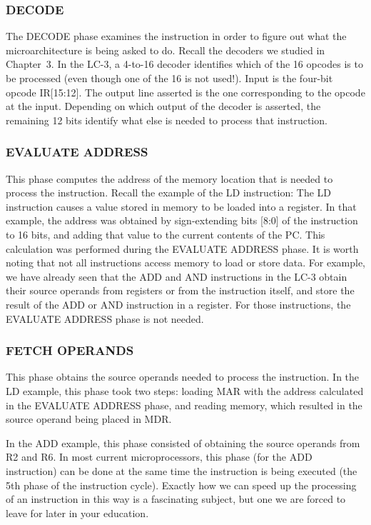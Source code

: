 \documentclass{patt}
\begin{document}
\subsubsection{DECODE}
The DECODE phase examines the instruction in order to figure out what
the microarchitecture is being asked to do.  Recall the decoders we
studied in Chapter~3.  In the LC-3, a 4-to-16 decoder identifies which
of the 16 opcodes is to be processed (even though one of the 16 is not 
used!).  Input is the four-bit opcode
IR[15:12].  The output line asserted is the one corresponding to the
opcode at the input.  Depending on which output of the decoder is
asserted, the remaining 12 bits identify what else is needed to
process that instruction.

\subsubsection{EVALUATE ADDRESS}
This phase computes the address of the memory location that is needed
to process the instruction.  Recall the example of the LD
instruction: The LD instruction causes a value stored in memory to be
loaded into a register.  In that example, the address was obtained by
sign-extending bits [8:0] of the instruction to 16 bits, and adding that
value to the current contents of the PC.  This calculation was
performed during the EVALUATE ADDRESS phase.  It is worth noting that not
all instructions access memory to load or store data.  For example, we have
already seen that the ADD and AND instructions in the LC-3 obtain their 
source operands
from registers or from the instruction itself, and store the result of the 
ADD or AND instruction in a register.  For those instructions, the 
EVALUATE ADDRESS phase is not needed.  

\subsubsection{FETCH OPERANDS}
This phase obtains the source operands needed to process the
instruction.  In the LD example, this phase took two steps: loading
MAR with the address calculated in the EVALUATE ADDRESS phase, and
reading memory, which resulted in the source operand being placed in
MDR.

In the ADD example, this phase consisted of obtaining the source
operands from R2 and R6. In most current microprocessors, this phase
(for the ADD instruction) can be done at the same time the instruction
is being executed (the 5th phase of the instruction cycle).  Exactly 
how we can speed up the processing of an
instruction in this way is a fascinating subject, but one we are
forced to leave for later in your education.
\end{document}
